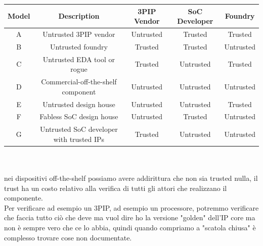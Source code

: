 \documentclass[oneside, 12pt]{extbook}
\begin{document}
\begin{table}[!h]
	\begin{tabular}{|c|c|c|c|c|}
		\hline\hline
		Model & Description & 3PIP Vendor & SoC Developer & Foundry\\
		\hline\hline
		A & Untrusted 3PIP vendor & {\color{red} Untrusted} & Trusted & Trusted\\
		\hline
		B & Untrusted foundry &  Trusted & Trusted & {\color{red} Untrusted}\\
		\hline
		C & Untrusted EDA tool or rogue  & Trusted & {\color{red} Untrusted} & Trusted\\
		\hline
		D & Commercial-off-the-shelf component & {\color{red} Untrusted} & {\color{red} Untrusted} & {\color{red} Untrusted}\\
		\hline
		E & Untrusted design house & {\color{red} Untrusted} & {\color{red} Untrusted} & Trusted\\
		\hline
		F & Fabless SoC design house & {\color{red} Untrusted} & Trusted & {\color{red} Untrusted}\\
		\hline
		G & Untrusted SoC developer with trusted IPs & Trusted & {\color{red} Untrusted} & {\color{red} Untrusted}\\
		\hline\hline
	\end{tabular}
\end{table}
\\\\nei dispositivi off-the-shelf possiamo avere addirittura che non sia trusted nulla, il trust ha un costo relativo alla verifica di tutti gli attori che realizzano il componente.
\\Per verificare ad esempio un 3PIP, ad esempio un processore, potremmo verificare che faccia tutto ciò che deve ma vuol dire ho la versione "golden" dell'IP core ma non è sempre vero che ce lo abbia, quindi quando compriamo a "scatola chiusa" è complesso trovare cose non documentate.
\end{document}
